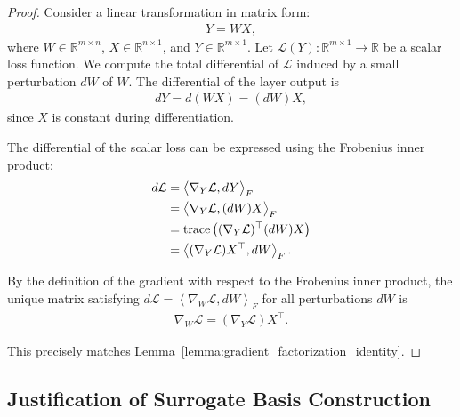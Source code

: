 \documentclass{article}
\theoremstyle{plain}
\theoremstyle{definition}
\theoremstyle{remark}
\begin{document}
\begin{proof}


Consider a linear transformation in matrix form:
\begin{align}
Y = W X,
\end{align}
where $W \in \mathbb{R}^{m \times n}$, $X \in \mathbb{R}^{n \times 1}$, and $Y \in \mathbb{R}^{m \times 1}$.
Let $\mathcal{L}(Y): \mathbb{R}^{m\times 1} \rightarrow \mathbb{R}$ be a scalar loss function. We compute the total differential of $\mathcal{L}$ induced by a small perturbation $dW$ of $W$.
The differential of the layer output is
\begin{align}
dY = d(W X) = (dW) X,
\end{align}
since $X$ is constant during differentiation.

The differential of the scalar loss can be expressed using the Frobenius inner product:
\begin{align}
d\mathcal{L}
&= \big\langle \nabla_Y \mathcal{L}, dY \big\rangle_F \notag\\
&= \big\langle \nabla_Y \mathcal{L}, (dW)X \big\rangle_F \notag\\
&= \mathrm{trace}\left((\nabla_Y \mathcal{L})^\top (dW)X\right) \notag\\
&= \left\langle (\nabla_Y \mathcal{L}) X^\top, dW \right\rangle_F.
\end{align}

By the definition of the gradient with respect to the Frobenius inner product, the unique matrix satisfying $d\mathcal{L} = \left\langle \nabla_W \mathcal{L}, dW \right\rangle_F$
for all perturbations $dW$ is
\begin{align}
\nabla_W \mathcal{L} = (\nabla_Y \mathcal{L}) X^\top.
\end{align}

This precisely matches Lemma~\ref{lemma:gradient_factorization_identity}.
\end{proof}


\newpage

\subsection{Justification of Surrogate Basis Construction}
\label{appendix_subsection:proof_surrogate_basis}
\end{document}
